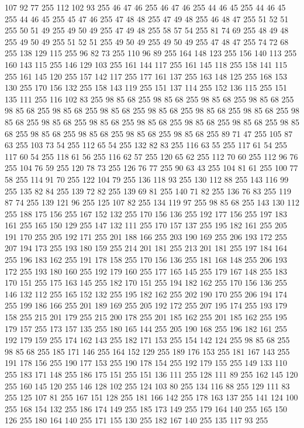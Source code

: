 107 92 77 255 112 102 93 255 46 47 46 255 46 47 46 255 44 46 45 255 44 46 45 255 44 46 45 255 45 47 46 255 47 48 48 255 47 49 48 255 46 48 47 255 51 52 51 255 50 51 49 255 49 50 49 255 47 49 48 255 58 57 54 255 81 74 69 255 48 49 48 255 49 50 49 255 51 52 51 255 49 50 49 255 49 50 49 255 47 48 47 255 74 72 68 255 138 129 115 255 96 82 73 255 110 96 89 255 164 148 123 255 156 140 113 255 160 143 115 255 146 129 103 255 161 144 117 255 161 145 118 255 158 141 115 255 161 145 120 255 157 142 117 255 177 161 137 255 163 148 125 255 168 153 130 255 170 156 132 255 158 143 119 255 151 137 114 255 152 136 115 255 151 135 111 255 116 102 83 255 98 85 68 255 98 85 68 255 98 85 68 255 98 85 68 255 98 85 68 255 98 85 68 255 98 85 68 255 98 85 68 255 98 85 68 255 98 85 68 255 98 85 68 255 98 85 68 255 98 85 68 255 98 85 68 255 98 85 68 255 98 85 68 255 98 85 68 255 98 85 68 255 98 85 68 255
98 85 68 255 98 85 68 255 89 71 47 255 105 87 63 255 103 73 54 255 112 65 54 255 132 82 83 255 116 63 55 255 117 61 54 255 117 60 54 255 118 61 56 255 116 62 57 255 120 65 62 255 112 70 60 255 112 96 76 255 104 76 59 255 120 78 73 255 126 76 77 255 90 63 43 255 104 81 61 255 100 77 58 255 114 91 70 255 122 104 79 255 136 118 93 255 130 112 88 255 143 116 99 255 135 82 84 255 139 72 82 255 139 69 81 255 140 71 82 255 136 76 83 255 119 87 74 255 139 121 96 255 125 107 82 255 134 119 97 255 98 85 68 255 143 130 112 255 188 175 156 255 167 152 132 255 170 156 136 255 192 177 156 255 197 183 161 255 165 150 129 255 147 132 111 255 170 157 137 255 195 182 161 255 205 191 170 255 205 192 171 255 201 188 166 255 203 190 169 255 206 193 172 255 207 194 173 255 193 180 159 255 214 201 181 255 213 201 181 255 197 184 164 255 196 183 162 255 191 178 158 255 170 156 136 255 181 168 148 255 206 193 172 255 193 180 160 255 192 179 160 255 177 165 145 255
179 167 148 255 183 170 151 255 175 163 145 255 182 170 151 255 194 182 162 255 170 156 136 255 146 132 112 255 165 152 132 255 195 182 162 255 202 190 170 255 206 194 174 255 199 186 166 255 201 189 169 255 205 192 172 255 207 195 174 255 193 179 158 255 215 201 179 255 215 200 178 255 201 185 162 255 201 185 162 255 195 179 157 255 173 157 135 255 180 165 144 255 205 190 168 255 196 182 161 255 192 179 159 255 174 162 143 255 182 171 153 255 154 142 124 255 98 85 68 255 98 85 68 255 185 171 146 255 164 152 129 255 189 176 153 255 181 167 143 255 191 178 156 255 190 177 153 255 190 178 154 255 192 179 155 255 149 133 110 255 183 171 148 255 186 175 151 255 151 136 111 255 128 111 89 255 162 145 120 255 160 145 120 255 146 128 102 255 124 103 80 255 134 116 88 255 129 111 83 255 125 107 81 255 167 151 128 255 181 166 142 255 178 163 137 255 141 124 100 255 168 154 132 255 186 174 149 255 185 173 149 255 179 164 140 255 165 150 126 255 180 164 140 255 171 155 130 255 182 167 140 255 135 117 93 255
